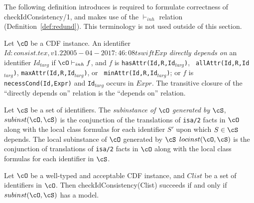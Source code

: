The following definition introduces is required to formulate
correctness of {\sf checkIdConsistency/1}, and makes use of the
$\vdash_{inh}$ relation (Definition~\ref{def:redund}).  This
terminology is not used outside of this section.
\begin{definition}
 Let $\cO$ be a CDF instance.  An identifier $Id: consist.tex,v 1.2 2005-04-20 17:46:08 tswift Exp $ {\em directly
 depends on} an identifier $Id_{targ}$ if $\cO \vdash_{inh} f$, and
 $f$ is {\tt hasAttr(Id,R,Id$_{targ}$)}, {\tt
 allAttr(Id,R,Id$_{targ}$)}, {\tt maxAttr(Id,R,Id$_{targ}$)}, or {\tt
 minAttr(Id,R,Id$_{targ}$)}; or $f$ is {\tt necessCond(Id,Expr)} and
 {\tt Id$_{targ}$} occurs in $Expr$.  The transitive closure of the
 ``directly depends on'' relation is the ``depends on'' relation.

Let $\cS$ be a set of identifiers.  The {\em subinstance of $\cO$
generated by $\cS$}, $subinst(\cO,\cS)$ is the conjunction of the
translations of {\tt isa/2} facts in $\cO$ along with the local class
formulas for each identifier $S'$ upon which $S \in \cS$ depends.  The
local subinstance of $\cO$ generated by $\cS$ $locinst(\cO,\cS)$ is
the conjunction of translations of {\tt isa/2} facts in $\cO$ along
with the local class formulas for each identifier in $\cS$.
\end{definition}

\begin{theorem} \label{thm:type1consist}
Let $\cO$ be a well-typed and acceptable CDF instance, and $Clist$ be
a set of identifiers in $\cO$.  Then {\sf checkIdConsistency(Clist)}
succeeds if and only if $subinst(\cO,\cS)$ has a model.
\end{theorem}

